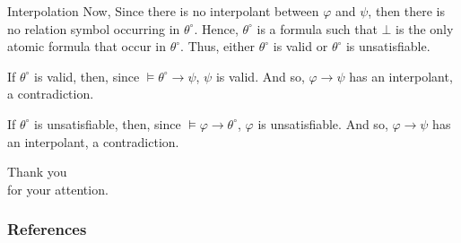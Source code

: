\documentclass{beamer}
\theoremstyle{definition}
\newcommand{\impli}{\rightarrow}
\begin{document}
\begin{frame}{Interpolation}
\qquad Now, Since there is no interpolant between $\varphi$ and $\psi$, then there is no relation symbol occurring in $\theta^{\circ}$. Hence, $\theta^{\circ}$ is a formula such that $\bot$ is the only atomic formula that occur in $\theta^{\circ}$. Thus, either $\theta^{\circ}$ is valid or $\theta^{\circ}$ is unsatisfiable.
\vspace{5mm}

\qquad If $\theta^{\circ}$ is valid, then, since $\models \theta^{\circ}\impli \psi$, $\psi$ is valid. And so, $\varphi \impli \psi$ has an interpolant, a contradiction.

\vspace{5mm}

\qquad If $\theta^{\circ}$ is unsatisfiable, then, since $\models \varphi \impli \theta^{\circ}$, $\varphi$ is unsatisfiable. And so, $\varphi \impli \psi$ has an interpolant, a contradiction.


\end{frame}





\begin{frame}

\begin{center}
{\color{blue} Thank you\\ for your attention.}
\end{center} 
	
	
\end{frame}












\begin{frame}[allowframebreaks]
\frametitle{References}


\end{frame}
\end{document}
